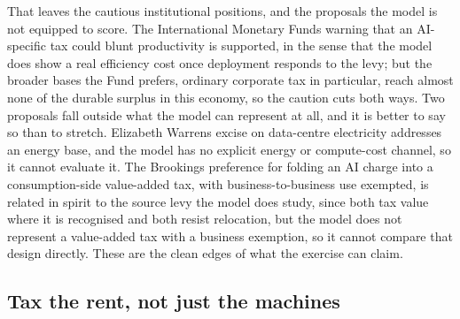 \documentclass[12pt]{article}
\begin{document}
That leaves the cautious institutional positions, and the proposals the
model is not equipped to score. The International Monetary
Fund\textquotesingle s warning that an AI-specific tax could blunt
productivity is supported, in the sense that the model does show a real
efficiency cost once deployment responds to the levy; but the broader
bases the Fund prefers, ordinary corporate tax in particular, reach
almost none of the durable surplus in this economy, so the caution cuts
both ways. Two proposals fall outside what the model can represent at
all, and it is better to say so than to stretch. Elizabeth
Warren\textquotesingle s excise on data-centre electricity addresses an
energy base, and the model has no explicit energy or compute-cost
channel, so it cannot evaluate it. The Brookings preference for folding
an AI charge into a consumption-side value-added tax, with
business-to-business use exempted, is related in spirit to the source
levy the model does study, since both tax value where it is recognised
and both resist relocation, but the model does not represent a
value-added tax with a business exemption, so it cannot compare that
design directly. These are the clean edges of what the exercise can
claim.

\hypertarget{tax-the-rent-not-just-the-machines}{%
\subsection{Tax the rent, not just the
machines}\label{tax-the-rent-not-just-the-machines}}
\end{document}
